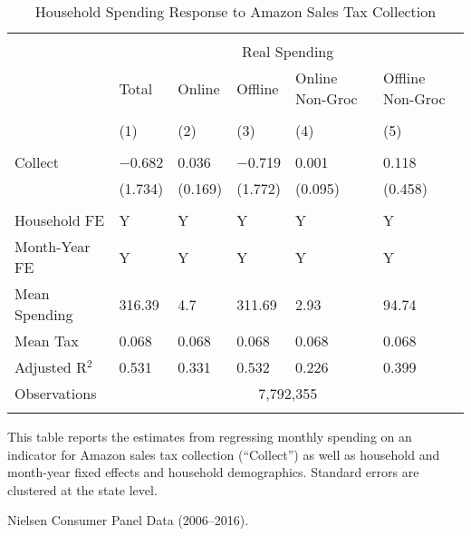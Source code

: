
\begin{table}[!htbp] \centering
  \caption{Household Spending Response to Amazon Sales Tax Collection}
  \label{tab:nielsenDiD}
\begin{tabularx}{\textwidth}{lXXXXX}
\\[-1.8ex]\hline
\hline \\[-1.8ex]
 & \multicolumn{5}{c}{Real Spending} \\
\cline{2-6}
 & Total & Online & Offline & Online Non-Groc & Offline Non-Groc \\
\\[-1.8ex] & (1) & (2) & (3) & (4) & (5)\\
\hline \\[-1.8ex]
 Collect & $-$0.682 & 0.036 & $-$0.719 & 0.001 & 0.118 \\
  & (1.734) & (0.169) & (1.772) & (0.095) & (0.458) \\
 \hline \\[-1.8ex]
Household FE & Y & Y & Y & Y & Y \\
Month-Year FE & Y & Y & Y & Y & Y \\
Mean Spending & 316.39 & 4.7 & 311.69 & 2.93 & 94.74 \\
Mean Tax & 0.068 & 0.068 & 0.068 & 0.068 & 0.068 \\
Adjusted R$^{2}$ & 0.531 & 0.331 & 0.532 & 0.226 & 0.399 \\
Observations & \multicolumn{5}{c}{7,792,355} \\
\hline
\hline \\[-1.8ex]
\end{tabularx}
\begin{tablenotes}
This table reports the estimates from regressing monthly spending on an indicator for Amazon sales tax collection (``Collect'') as well as household and month-year fixed effects and household demographics. Standard errors are clustered at the state level.
\end{tablenotes}
\begin{tablenotes}[Source]
Nielsen Consumer Panel Data (2006--2016).
\end{tablenotes}
\end{table}
